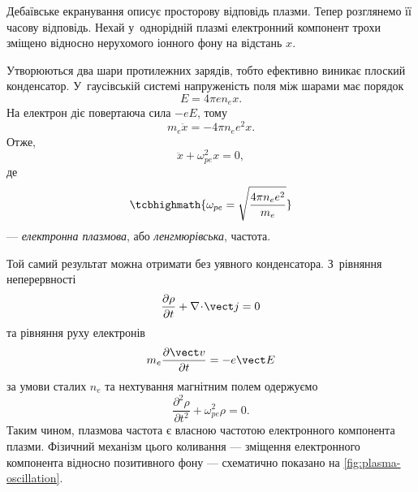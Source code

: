 Дебаївське екранування описує просторову відповідь плазми. Тепер розглянемо її часову відповідь. Нехай у~однорідній плазмі електронний компонент трохи зміщено відносно нерухомого іонного фону на відстань $x$.

Утворюються два шари протилежних зарядів, тобто ефективно виникає плоский конденсатор. У~гаусівській системі напруженість поля між шарами має порядок
\begin{equation}
	E=4\pi e n_e x.
\end{equation}
На електрон діє повертаюча сила $-eE$, тому
\begin{equation}
	m_e\ddot x
	=-4\pi n_e e^2 x.
\end{equation}
Отже,
\begin{equation}
	\ddot x+\omega_{pe}^2x=0,
\end{equation}
де
\begin{equation}
	\tcbhighmath{
		\omega_{pe}
		=\sqrt{\frac{4\pi n_e e^2}{m_e}}
	}
\end{equation}
--- \emph{електронна плазмова}, або \emph{ленгмюрівська}, частота.

Той самий результат можна отримати без уявного конденсатора. З~рівняння неперервності
\begin{equation}
	\frac{\partial\rho}{\partial t}
	+\nabla\!\cdot\!\vect j=0
\end{equation}
та рівняння руху електронів
\begin{equation}
	m_e\frac{\partial\vect v}{\partial t}=-e\vect E
\end{equation}
за умови сталих $n_e$ та нехтування магнітним полем одержуємо
\begin{equation}
	\frac{\partial^2\rho}{\partial t^2}
	+\omega_{pe}^2\rho=0.
\end{equation}
Таким чином, плазмова частота є власною частотою електронного компонента плазми. Фізичний механізм цього коливання — зміщення електронного компонента відносно позитивного фону — схематично показано на \ref{fig:plasma-oscillation}.

